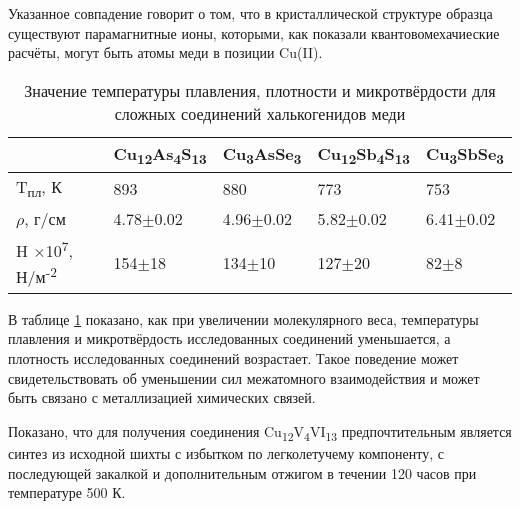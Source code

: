 Указанное совпадение говорит о том, что в кристаллической структуре образца существуют парамагнитные ионы, которыми, как показали квантовомехачиеские расчёты, могут быть атомы меди в позиции Cu(II).

\begin{table} [htbp]%
    \centering
	\caption{Значение температуры плавления, плотности и микротвёрдости для сложных соединений халькогенидов меди}%
	\label{hard}%
    \renewcommand{\arraystretch}{1.5}
	\begin{tabular}{@{}@{\extracolsep{20pt}}lllll@{}}
        \toprule     %
    	 & Cu\textsubscript{12}As\textsubscript{4}S\textsubscript{13} &Cu\textsubscript{3}AsSe\textsubscript{3}& Cu\textsubscript{12}Sb\textsubscript{4}S\textsubscript{13} &Cu\textsubscript{3}SbSe\textsubscript{3}	\\
        \midrule
    T\textsubscript{пл}, К & 893 & 880												& 773& 753	\\ \hline
    	$ \rho$, г/см 	&  4.78$\pm$0.02	 						& 4.96$\pm$0.02												&5.82$\pm$0.02 	& 6.41$\pm$0.02 \\ \hline
    	H $\times$10\textsuperscript{7}, Н/м\textsuperscript{-2} 	& 154$\pm$18	 						& 134$\pm$10 	& 127$\pm$20			& 82$\pm$8	\\ \hline

        \bottomrule
	\end{tabular}%
\end{table}
В таблице \ref{hard} показано, как при увеличении молекулярного веса, температуры плавления и микротвёрдость исследованных соединений уменьшается, а плотность исследованных соединений возрастает. Такое поведение может свидетельствовать об уменьшении сил межатомного взаимодействия и может быть связано с металлизацией химических
связей.

Показано, что для получения соединения Cu\textsubscript{12}V\textsubscript{4}VI\textsubscript{13} предпочтительным является синтез из
исходной шихты с избытком по легколетучему компоненту, с последующей закалкой и
дополнительным отжигом в течении 120 часов при температуре 500 К.
\clearpage

\newpage
